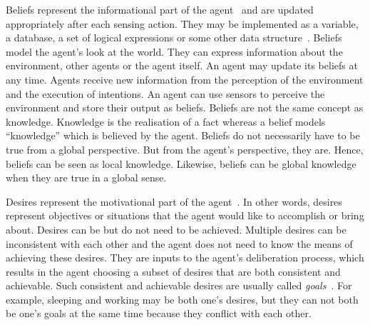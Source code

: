 Beliefs represent the informational part of the agent~\cite{Rao_BDITheory_1995} and are updated appropriately after each sensing action.
They may be implemented as a variable, a database, a set of logical expressions or some other data structure~\cite{Rao_BDITheory_1995}.
Beliefs model the agent's look at the world.
They can express information about the environment, other agents or the agent itself.
An agent may update its beliefs at any time.
Agents receive new information from the perception of the environment and the execution of intentions.
An agent can use sensors to perceive the environment and store their output as beliefs.
Beliefs are not the same concept as knowledge.
Knowledge is the realisation of a fact whereas a belief models \enquote{knowledge} which is believed by the agent.
Beliefs do not necessarily have to be true from a global perspective.
But from the agent's perspective, they are.
Hence, beliefs can be seen as local knowledge.
Likewise, beliefs can be global knowledge when they are true in a global sense.

Desires represent the motivational part of the agent~\cite{Rao_BDITheory_1995}.
In other words, desires represent objectives or situations that the agent would like to accomplish or bring about.
Desires can be but do not need to be achieved.
Multiple desires can be inconsistent with each other and the agent does not need to know the means of achieving these desires.
They are inputs to the agent's deliberation process, which results in the agent choosing a subset of desires that are both consistent and achievable.
Such consistent and achievable desires are usually called \emph{goals}~\cite{Gerhard_MultiSystem_1999}.
For example, sleeping and working may be both one's desires, but they can not both be one's goals at the same time because they conflict with each other.

